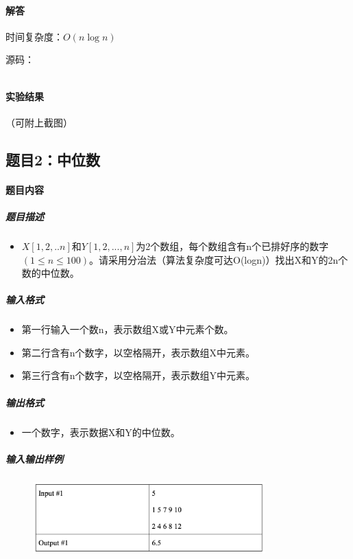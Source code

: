 \documentclass[12pt,a4paper]{ctexart}
\begin{document}
\vspace{5pt}

\paragraph{解答} 时间复杂度：$O(n \log n)$

源码：
\inputminted[bgcolor=codebg,frame=lines,autogobble,linenos=true,breaklines]{cpp}{src/t1.cpp}

\vspace{5pt}

\paragraph{实验结果}
（可附上截图）

\newpage

\subsection*{题目2：中位数}
\paragraph{题目内容}
\subparagraph{题目描述}
\begin{itemize}
    \item $X[1,2,..n]$和$Y[1,2,...,n]$为2个数组，每个数组含有n个已排好序的数字$(1 \leq n \leq 100)$。请采用分治法（算法复杂度可达O(logn)）找出X和Y的2n个数的中位数。
\end{itemize}

\subparagraph{输入格式}
    \begin{itemize}
        \item 第一行输入一个数n，表示数组X或Y中元素个数。
        \item 第二行含有n个数字，以空格隔开，表示数组X中元素。
        \item 第三行含有n个数字，以空格隔开，表示数组Y中元素。
    \end{itemize}

\subparagraph{输出格式}
    \begin{itemize}
        \item 一个数字，表示数据X和Y的中位数。
    \end{itemize}
    
\subparagraph{输入输出样例}
    \begin{figure}[h]
        \centering
        \includegraphics[width=0.80\textwidth]{q2_iodata.png}
    \end{figure}
\end{document}
